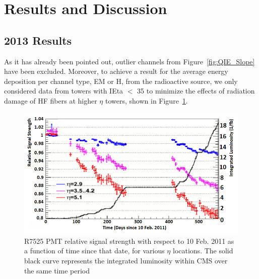 \section{Results and Discussion}
\subsection{2013 Results}
As it has already been pointed out, outlier channels from Figure~\ref{fig:QIE_Slope} have been excluded.
Moreover, to achieve a result for the average energy deposition per channel type,
EM or H, from the radioactive source, we only considered data from towers with
IEta $<$ 35 to minimize the effects of radiation damage of HF fibers at higher $\eta$ towers, shown in Figure~\ref{fig:PMT_Drift}.
\begin{figure}[htb]
   \begin{center}
      \includegraphics[width=.9\textwidth]{figures/ch_hfcalibration/PMT_Drift.png}
      \caption{R7525 PMT relative signal strength with respect to 10 Feb. 2011 as a
      function of time since that date, for various $\eta$ locations. The solid
      black curve represents the integrated luminosity within CMS over the same
      time period}
      \label{fig:PMT_Drift}
   \end{center}
\end{figure}

